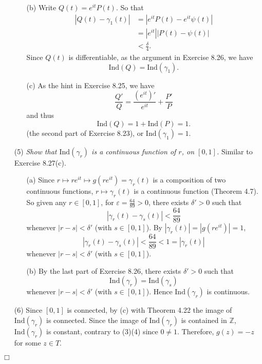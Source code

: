 \documentclass{article}
\begin{document}
\begin{enumerate}
\begin{enumerate}
    \item[(b)]
    Write $Q(t) = e^{it}P(t)$.
    So that
    \begin{align*}
      |Q(t) - \gamma_1(t)|
      &= |e^{it}P(t) - e^{it}\psi(t)| \\
      &= |e^{it}||P(t) - \psi(t)| \\
      &< \frac{\delta}{4}.
    \end{align*}
    Since $Q(t)$ is differentiable,
    as the argument in Exercise 8.26, we have
    \[
      \mathrm{Ind}(Q) = \mathrm{Ind}(\gamma_1).
    \]

    \item[(c)]
    As the hint in Exercise 8.25, we have
    \[
      \frac{Q'}{Q} = \frac{(e^{it})'}{e^{it}} + \frac{P'}{P}
    \]
    and thus
    \[
      \mathrm{Ind}(Q) = 1 + \mathrm{Ind}(P) = 1.
    \]
    (the second part of Exercise 8.23), or $\mathrm{Ind}(\gamma_1) = 1$.
  \end{enumerate}

  \item[(5)]
  \emph{Show that $\mathrm{Ind}(\gamma_r)$ is a continuous function of $r$, on $[0,1]$.}
  Similar to Exercise 8.27(c).
  \begin{enumerate}
    \item[(a)]
    Since $r \mapsto re^{it} \mapsto g(re^{it}) = \gamma_r(t)$
    is a composition of two continuous functions,
    $r \mapsto \gamma_r(t)$ is a continuous function (Theorem 4.7).
    So given any $r \in [0,1]$,
    for $\varepsilon = \frac{64}{89} > 0$,
    there exists $\delta' > 0$ such that
    \[
      |\gamma_r(t) - \gamma_s(t)| < \frac{64}{89}
    \]
    whenever $|r-s| < \delta'$ (with $s \in [0,1]$).
    By $|\gamma_r(t)| = |g(re^{it})| = 1$,
    \[
      |\gamma_r(t) - \gamma_s(t)| < \frac{64}{89} < 1 = |\gamma_r(t)|
    \]
    whenever $|r-s| < \delta'$ (with $s \in [0,1]$).

    \item[(b)]
    By the last part of Exercise 8.26, there exists $\delta' > 0$ such that
    \[
      \mathrm{Ind}(\gamma_r) = \mathrm{Ind}(\gamma_s)
    \]
    whenever $|r-s| < \delta'$ (with $s \in [0,1]$).
    Hence $\mathrm{Ind}(\gamma_r)$ is continuous.
  \end{enumerate}

  \item[(6)]
  Since $[0,1]$ is connected, by (c) with Theorem 4.22
  the image of $\mathrm{Ind}(\gamma_r)$ is connected.
  Since the image of $\mathrm{Ind}(\gamma_r)$ is contained in $\mathbb{Z}$,
  $\mathrm{Ind}(\gamma_r)$ is constant, contrary to (3)(4) since $0 \neq 1$.
  Therefore, $g(z) = -z$ for some $z \in T$.
\end{enumerate}
$\Box$ \\\\
\end{document}
